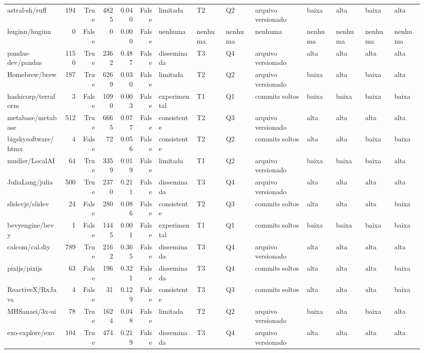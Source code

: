 \begin{tabular}{lrrrrrllllllll}
astral-sh/ruff & 194 & True & 4825 & 0.040 & False & limitada & T2 & Q2 & arquivo versionado & baixa & alta & baixa & alta \\
huginn/huginn & 0 & False & 0 & 0.000 & False & nenhuma & nenhuma & nenhuma & nenhuma & nenhuma & nenhuma & nenhuma & nenhuma \\
pandas-dev/pandas & 1150 & True & 2362 & 0.487 & False & disseminada & T3 & Q4 & arquivo versionado & alta & alta & alta & alta \\
Homebrew/brew & 187 & True & 6269 & 0.030 & False & limitada & T2 & Q2 & arquivo versionado & baixa & alta & baixa & alta \\
hashicorp/terraform & 3 & False & 1090 & 0.003 & False & experimental & T1 & Q1 & commits soltos & baixa & baixa & baixa & baixa \\
metabase/metabase & 512 & True & 6665 & 0.077 & False & consistente & T2 & Q3 & arquivo versionado & alta & alta & alta & alta \\
bigskysoftware/htmx & 4 & False & 72 & 0.056 & False & consistente & T2 & Q2 & commits soltos & alta & alta & baixa & baixa \\
mudler/LocalAI & 64 & True & 3359 & 0.019 & False & limitada & T1 & Q2 & arquivo versionado & baixa & baixa & baixa & alta \\
JuliaLang/julia & 500 & True & 2370 & 0.211 & False & disseminada & T3 & Q4 & arquivo versionado & alta & alta & alta & alta \\
slidevjs/slidev & 24 & False & 280 & 0.086 & False & consistente & T2 & Q3 & commits soltos & alta & alta & alta & baixa \\
bevyengine/bevy & 1 & False & 1445 & 0.001 & False & experimental & T1 & Q1 & commits soltos & baixa & baixa & baixa & baixa \\
calcom/cal.diy & 789 & True & 2162 & 0.365 & False & disseminada & T3 & Q4 & arquivo versionado & alta & alta & alta & alta \\
pixijs/pixijs & 63 & False & 196 & 0.321 & False & disseminada & T3 & Q4 & commits soltos & alta & alta & alta & baixa \\
ReactiveX/RxJava & 4 & False & 31 & 0.129 & False & consistente & T3 & Q3 & commits soltos & alta & alta & alta & baixa \\
MHSanaei/3x-ui & 78 & True & 1624 & 0.048 & False & limitada & T2 & Q2 & arquivo versionado & baixa & alta & baixa & alta \\
exo-explore/exo & 104 & True & 474 & 0.219 & False & disseminada & T3 & Q4 & arquivo versionado & alta & alta & alta & alta \\

\end{tabular}
